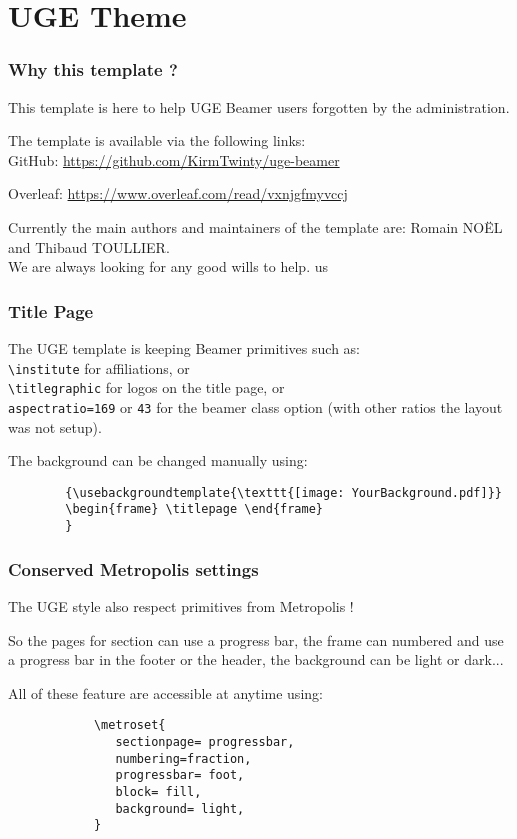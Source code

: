 %
\section{UGE Theme}

	\begin{frame}
		\frametitle{Why this template ?}

		This template is here to help UGE Beamer users forgotten by the administration.
		\bigskip

		The template is available via the following links:\\
		\textbullet GitHub: %
		\url{https://github.com/KirmTwinty/uge-beamer}

		\textbullet Overleaf: %
		\url{https://www.overleaf.com/read/vxnjgfmyvccj}
		\bigskip

		Currently the main authors and maintainers of the template are:
		Romain NOËL and Thibaud TOULLIER.\\
		We are always looking for any good wills to help. us
	\end{frame}


	\begin{frame}[fragile]
		\frametitle{Title Page}

		The UGE template is keeping Beamer primitives such as: \\
		\quad \verb#\institute# for affiliations, or \\
		\quad \verb#\titlegraphic# for logos on the title page, or \\
		\quad \verb#aspectratio=169# or \verb|43| for the beamer class option (with other ratios the layout was not setup).
		\bigskip
		
		The background can be changed manually using:
		\begin{verbatim} 
		{\usebackgroundtemplate{\texttt{[image: YourBackground.pdf]}}
		\begin{frame} \titlepage \end{frame}
		}
		\end{verbatim}
	\end{frame}


	\begin{frame}[fragile]
		\frametitle{Conserved Metropolis settings}

		The UGE style also respect primitives from Metropolis !

		So the pages for section can use a progress bar, the frame can numbered and use a progress bar in the footer or the header, the background can be light or dark...
		\bigskip

		All of these feature are accessible at anytime using:%
		\begin{verbatim}
			\metroset{
			   sectionpage= progressbar,
			   numbering=fraction,
			   progressbar= foot, 
			   block= fill,
			   background= light,
			}
		\end{verbatim}
	\end{frame}


